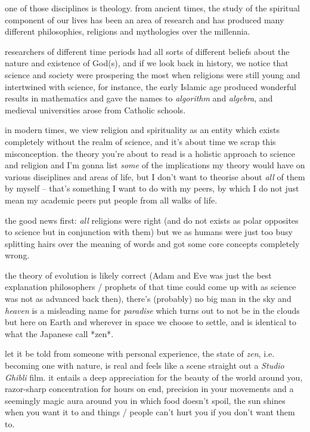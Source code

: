 \documentclass[12pt]{report}
\theoremstyle{definition}
\theoremstyle{remark}
\begin{document}
one of those disciplines is theology. from ancient times, the study of the spiritual component of our lives has been an area of research and has produced many different philosophies, religions and mythologies over the millennia.

researchers of different time periods had all sorts of different beliefs about the nature and existence of God(s), and if we look back in history, we notice that science and society were prospering the most when religions were still young and intertwined with science, for instance, the early Islamic age produced wonderful results in mathematics and gave the names to \emph{algorithm} and \emph{algebra}, and medieval universities arose from Catholic schools.

in modern times, we view religion and spirituality as an entity which exists completely without the realm of science, and it's about time we scrap this misconception. the theory you're about to read is a holistic approach to science and religion and I'm gonna list \emph{some} of the implications my theory would have on various disciplines and areas of life, but I don't want to theorise about \emph{all} of them by myself -- that's something I want to do with my peers, by which I do not just mean my academic peers put people from all walks of life.

the good news first: \emph{all} religions were right (and do not exists as polar opposites to science but in conjunction with them) but we as humans were just too busy splitting hairs over the meaning of words and got some core concepts completely wrong.

the theory of evolution is likely correct (Adam and Eve was just the best explanation philosophers / prophets of that time could come up with as science was not as advanced back then), there's (probably) no big man in the sky and \emph{heaven} is a misleading name for \emph{paradise} which turns out to not be in the clouds but here on Earth and wherever in space we choose to settle, and is identical to what the Japanese call *zen*.

let it be told from someone with personal experience, the state of \emph{zen}, i.e. becoming one with nature, is real and feels like a scene straight out a \emph{Studio Ghibli} film. it entails a deep appreciation for the beauty of the world around you, razor-sharp concentration for hours on end, precision in your movements and a seemingly magic aura around you in which food doesn't spoil, the sun shines when you want it to and things / people can't hurt you if you don't want them to.
\end{document}
